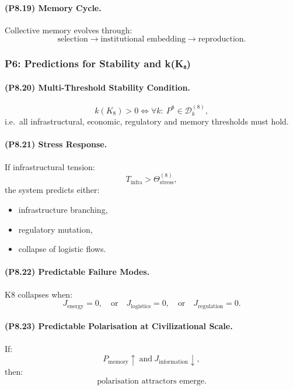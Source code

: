 \paragraph{(P8.19) Memory Cycle.}
Collective memory evolves through:
\[
\text{selection}
\to \text{institutional embedding}
\to \text{reproduction}.
\]

\subsubsection{P6: Predictions for Stability and k(K₈)}

\paragraph{(P8.20) Multi-Threshold Stability Condition.}
\[
k(K_8) > 0
\iff
\forall k: \ P^8 \in \mathcal{D}_k^{(8)},
\]
i.e.\ all infrastructural, economic, regulatory and memory thresholds must hold.

\paragraph{(P8.21) Stress Response.}
If infrastructural tension:
\[
T_{\mathrm{infra}} > \Theta_{\mathrm{stress}}^{(8)},
\]
the system predicts either:
\begin{itemize}
    \item infrastructure branching,
    \item regulatory mutation,
    \item collapse of logistic flows.
\end{itemize}

\paragraph{(P8.22) Predictable Failure Modes.}
K8 collapses when:
\[
J_{\mathrm{energy}} = 0,
\quad \text{or} \quad
J_{\mathrm{logistics}} = 0,
\quad \text{or} \quad
J_{\mathrm{regulation}} = 0.
\]

\paragraph{(P8.23) Predictable Polarisation at Civilizational Scale.}
If:
\[
P_{\mathrm{memory}} \uparrow \ \text{and} \
J_{\mathrm{information}} \downarrow,
\]
then:
\[
\text{polarisation attractors emerge}.
\]

